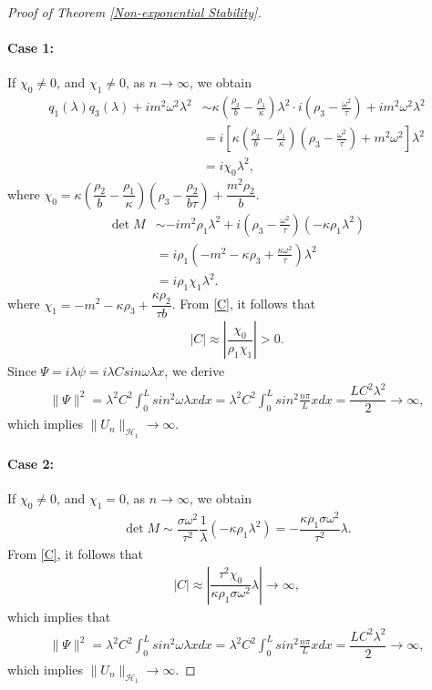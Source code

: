 \documentclass[11pt,reqno]{article}
\begin{document}
\begin{proof}[Proof of Theorem \ref{Non-exponential Stability}]
  	\paragraph{Case 1:}If $\chi_0 \neq 0$, and $\chi_1 \neq 0$, as $n \to \infty$, we obtain
  	\begin{align*}
  		q_1(\lambda)q_3(\lambda) + im^2\omega^2\lambda^2 &\sim \kappa\left(\frac{\rho_2}{b}-\frac{\rho_1}{\kappa}\right)\lambda^2 \cdot i\left(\rho_3-\frac{\omega^2}{\tau}\right) + im^2\omega^2\lambda^2 \\
  		&= i\left[\kappa\left(\frac{\rho_2}{b}-\frac{\rho_1}{\kappa}\right)\left(\rho_3-\frac{\omega^2}{\tau}\right) + m^2\omega^2\right]\lambda^2 \\
  		&= i\chi_0\lambda^2,
  	\end{align*}
  	where $\chi_0 = \kappa\left(\dfrac{\rho_2}{b} -  \dfrac{\rho_1}{\kappa}\right)\left(\rho_3 - \dfrac{\rho_2}{b\tau}\right) + \dfrac{m^2 \rho_2}{b}$.
  	\begin{align*}
  		\det M &\sim -im^2 \rho_1 \lambda^2 + i \left(\rho_3 - \frac{\omega^2}{\tau}\right)(-\kappa \rho_1 \lambda^2) \\
  		&= i \rho_1 \left(-m^2 - \kappa \rho_3 + \frac{\kappa \omega^2}{\tau}\right) \lambda^2\\
  		&=i \rho_1 \chi_1 \lambda^2.
  	\end{align*}
  	where $\chi_1 = -m^2 - \kappa\rho_3 + \dfrac{\kappa\rho_2}{\tau b}$.
  	From \eqref{C}, it follows that
  	\begin{align*}
  		|C| \approx \left|\dfrac{\chi_0}{\rho_1 \chi_1}\right| > 0.
  	\end{align*}
  	Since $\Psi = i \lambda \psi = i \lambda C sin\omega \lambda x$, we derive
  	\begin{align*}
  		\|\Psi\|^2 = \lambda^2 C^2 \int_{0}^{L} sin^2\omega\lambda x dx = \lambda^2 C^2 \int_{0}^{L} sin^2\frac{n\pi}{L}x dx = \dfrac{LC^2\lambda^2}{2} \to \infty,
  	\end{align*}
  	which implies $\|U_n\|_{\mathcal{H}_1} \to \infty$.
  	\paragraph{Case 2:}If $\chi_0 \neq 0$, and $\chi_1 = 0$, as $n \to \infty$, we obtain
  	\begin{align*}
  		\det M \sim \dfrac{\sigma \omega^2}{\tau^2} \dfrac{1}{\lambda}(-\kappa \rho_1 \lambda^2) = -\dfrac{\kappa \rho_1 \sigma \omega^2}{\tau^2} \lambda.
  	\end{align*}
  	From \eqref{C}, it follows that
  	\begin{align*}
  		|C| \approx \left|\dfrac{\tau^2 \chi_0}{\kappa \rho_1 \sigma \omega^2}\lambda\right| \to \infty,
  	\end{align*}
  	which implies that
  	\begin{align*}
  		\|\Psi\|^2 = \lambda^2 C^2 \int_{0}^{L} sin^2\omega\lambda x dx = \lambda^2 C^2 \int_{0}^{L} sin^2\frac{n\pi}{L}x dx = \dfrac{LC^2\lambda^2}{2} \to \infty,
  	\end{align*}
  	which implies $\|U_n\|_{\mathcal{H}_1} \to \infty$.

\end{proof}
\end{document}
